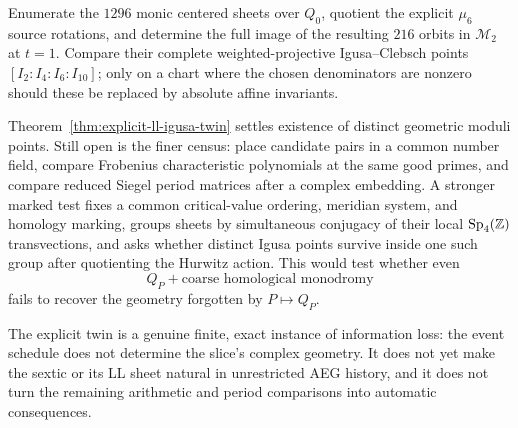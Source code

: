 \begin{problem}
\label{prob:ll-igusa-twin-test}
Enumerate the $1296$ monic centered sheets over $Q_0$, quotient the explicit
$\mu_6$ source rotations, and determine the full image of the resulting $216$
orbits in $\mathcal M_2$ at $t=1$.  Compare their complete
weighted-projective Igusa--Clebsch points
$[I_2:I_4:I_6:I_{10}]$; only on a chart where the chosen denominators are
nonzero should these be replaced by absolute affine invariants.

Theorem~\ref{thm:explicit-ll-igusa-twin} settles existence of distinct
geometric moduli points.  Still open is the finer census: place candidate
pairs in a common number field, compare Frobenius characteristic polynomials
at the same good primes, and compare reduced Siegel period matrices after a
complex embedding.  A stronger marked test fixes a common critical-value
ordering, meridian system, and homology marking, groups sheets by simultaneous
conjugacy of their local $\operatorname{Sp}_4(\mathbb{Z})$ transvections, and asks
whether distinct Igusa points survive inside one such group after quotienting
the Hurwitz action.  This would test whether even
\begin{equation}
 Q_P+\text{coarse homological monodromy}
 \label{eq:ll-igusa-strong-forgetting-test}
\end{equation}
fails to recover the geometry forgotten by $P\mapsto Q_P$.
\end{problem}

The explicit twin is a genuine finite, exact instance of information loss:
the event schedule does not determine the slice's complex geometry.  It does
not yet make the sextic or its LL sheet natural in unrestricted AEG history,
and it does not turn the remaining arithmetic and period comparisons into
automatic consequences.
